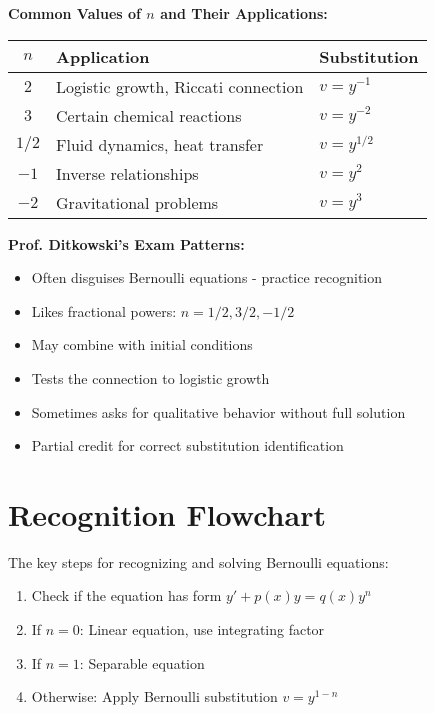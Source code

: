 \documentclass[12pt]{article}
\begin{document}
\begin{insight}
\textbf{Common Values of $n$ and Their Applications:}
\begin{center}
\begin{tabular}{|c|l|l|}
\hline
$n$ & Application & Substitution \\
\hline
$2$ & Logistic growth, Riccati connection & $v = y^{-1}$ \\
$3$ & Certain chemical reactions & $v = y^{-2}$ \\
$1/2$ & Fluid dynamics, heat transfer & $v = y^{1/2}$ \\
$-1$ & Inverse relationships & $v = y^2$ \\
$-2$ & Gravitational problems & $v = y^3$ \\
\hline
\end{tabular}
\end{center}
\end{insight}

\begin{examtip}
\textbf{Prof. Ditkowski's Exam Patterns:}
\begin{itemize}
    \item Often disguises Bernoulli equations - practice recognition
    \item Likes fractional powers: $n = 1/2, 3/2, -1/2$
    \item May combine with initial conditions
    \item Tests the connection to logistic growth
    \item Sometimes asks for qualitative behavior without full solution
    \item Partial credit for correct substitution identification
\end{itemize}
\end{examtip}

\section{Recognition Flowchart}

The key steps for recognizing and solving Bernoulli equations:

\begin{enumerate}
\item Check if the equation has form $y' + p(x)y = q(x)y^n$
\item If $n = 0$: Linear equation, use integrating factor
\item If $n = 1$: Separable equation
\item Otherwise: Apply Bernoulli substitution $v = y^{1-n}$
\end{enumerate}
\end{document}
